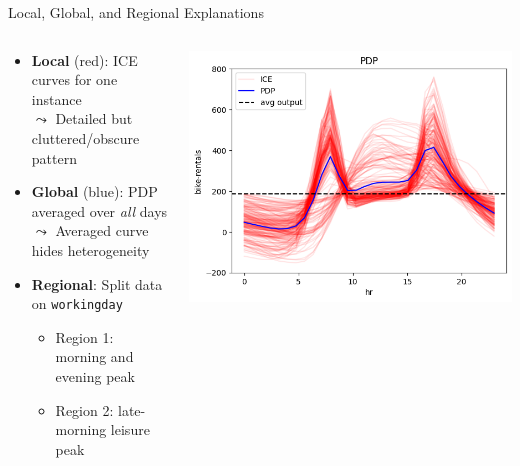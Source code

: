 \documentclass[11pt,compress,t,notes=noshow, aspectratio=169, xcolor=table]{beamer}
\begin{document}
\begin{frame}{Local, Global, and Regional Explanations}
  \begin{columns}[T,totalwidth=\textwidth]

    \begin{column}{0.6\linewidth}
      \small
      \begin{itemize}
        \item \textbf{Local} (red): ICE curves for one instance\\
        $\leadsto$ Detailed but cluttered/obscure pattern
        \item \textbf{Global} (blue): PDP averaged over \emph{all} days\\
        $\leadsto$ Averaged curve hides heterogeneity
        \item \textbf{Regional}: Split data on \texttt{workingday}
             \begin{itemize}%
             \item Region 1: morning and  evening peak
             \item Region 2: late-morning leisure peak
        \end{itemize}
      \end{itemize}
    \end{column}
    \begin{column}{0.4\linewidth}
  \centering

  \includegraphics[trim=0 0 0 20, clip, width=\textwidth]{figure/01_bike_sharing_dataset_18_1.png}


\end{column}
\end{columns}
\end{frame}
\end{document}
